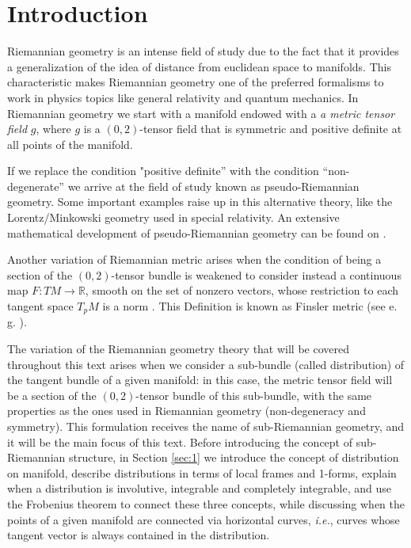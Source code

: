 \documentclass[12pt, letterpaper, reqno]{amsart}
\theoremstyle{definition}
\theoremstyle{plain}
\theoremstyle{remark}
\begin{document}
\section*{Introduction}
\label{sec:0}

Riemannian geometry is an intense field of study due to the fact that it provides a generalization of the idea of distance from euclidean space to manifolds. 
This characteristic makes Riemannian geometry one of the preferred formalisms to work in physics topics like general relativity and quantum mechanics. 
In Riemannian geometry we start with a manifold endowed with a \emph{a metric tensor field} $g$, where $g$ is a $(0,2)$-tensor field that is symmetric and positive definite at all points of the manifold. 

If we replace the condition "positive definite'' with the condition ``non-degenerate'' we arrive at the field of study known as pseudo-Riemannian geometry. Some important examples raise up in this alternative theory, like the Lorentz/Minkowski geometry used in special relativity. 
An extensive mathematical development of pseudo-Riemannian geometry can be found on \cite{o1983semi}.

Another variation of Riemannian metric arises when the condition of being a section of the $(0,2)$-tensor bundle is weakened to consider instead a continuous map $F: TM \rightarrow \mathbb{R}$, smooth on the set of nonzero vectors, whose restriction to each tangent space $T_pM$ is a norm \cite[p.~47]{lee2018introduction}. This Definition is known as Finsler metric (see e.\, g. \cite{bao2012introduction}).

The variation of  the Riemannian geometry theory that will be covered throughout this text arises when we consider a sub-bundle (called distribution) of the tangent bundle of a given manifold: in this case, the metric tensor field will be a section of the $ (0,2) $-tensor bundle of this sub-bundle, with the same properties as the ones used in Riemannian geometry (non-degeneracy and symmetry). This formulation receives the name of sub-Riemannian geometry, and it will be the main focus of this text. Before introducing the concept of sub-Riemannian structure, in Section \ref{sec:1} we introduce the concept of distribution on manifold, describe distributions in terms of local frames and 1-forms, explain when a distribution is involutive, integrable and completely integrable, and use the Frobenius theorem to connect these three concepts, while discussing when the points of a given manifold are connected via horizontal curves, \textit{i.e.}, curves whose tangent vector is always contained in the distribution.
\end{document}
